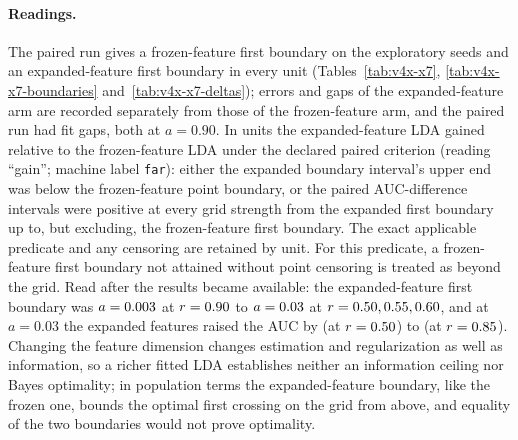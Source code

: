 \paragraph{Readings.}
The paired run gives a frozen-feature first boundary on the exploratory seeds and an expanded-feature first boundary in every unit (Tables~\ref{tab:v4x-x7}, \ref{tab:v4x-x7-boundaries} and~\ref{tab:v4x-x7-deltas}); errors and gaps of the expanded-feature arm are recorded separately from those of the frozen-feature arm, and the paired run had  fit gaps, both at $a=0.90$. In  units the expanded-feature LDA gained relative to the frozen-feature LDA under the declared paired criterion (reading ``gain''; machine label \texttt{far}): either the expanded boundary interval's upper end was below the frozen-feature point boundary, or the paired AUC-difference intervals were positive at every grid strength from the expanded first boundary up to, but excluding, the frozen-feature first boundary. The exact applicable predicate and any censoring are retained by unit. For this predicate, a frozen-feature first boundary not attained without point censoring is treated as beyond the grid.
Read after the results became available: the expanded-feature first boundary was $a=\resultnum{j.x7.first.min}{0.003}$ at $r=\resultnum{j.x7.first.min.r}{0.90}$ to $a=\resultnum{j.x7.first.max}{0.03}$ at $r=\resultnum{j.x7.first.max.r}{0.50, 0.55, 0.60}$, and at $a=0.03$ the expanded features raised the AUC by  (at $r=\resultnum{j.x7.auc_gain.a0300.min.r}{0.50}$) to  (at $r=\resultnum{j.x7.auc_gain.a0300.max.r}{0.85}$).
Changing the feature dimension changes estimation and regularization as well as information, so a richer fitted LDA establishes neither an information ceiling nor Bayes optimality; in population terms the expanded-feature boundary, like the frozen one, bounds the optimal first crossing on the grid from above, and equality of the two boundaries would not prove optimality.
